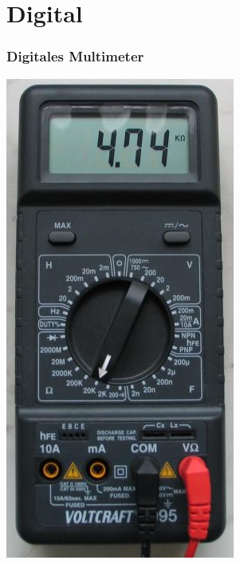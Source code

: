 \section*{Digital}

\begin{frame}
    \frametitle{Digitales Multimeter}
    \begin{center}
        \includegraphics[width=.35\textwidth]{e17/digitalmultimeter.jpg}
	\end{center}
\end{frame}


